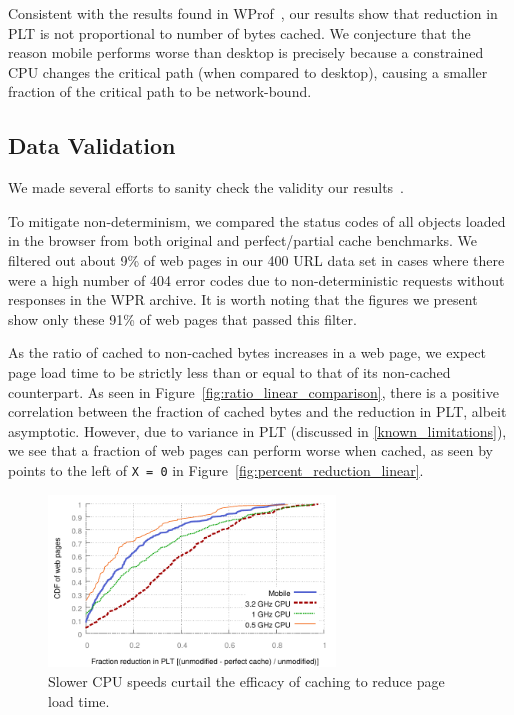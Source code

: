 Consistent with the results found in WProf~\cite{wang2013demystifying}, our results show that reduction in PLT is not proportional to number of bytes cached. We conjecture that the reason mobile performs worse than desktop is precisely because a constrained CPU changes the critical path (when compared to desktop), causing a smaller fraction of the critical path to be network-bound. 


\subsection{Data Validation}
\label{subsec:validation}
We made several efforts to sanity check the validity our results~\cite{sanity-checks}. 

To mitigate non-determinism, we compared the status codes of all objects loaded in the browser from both original and perfect/partial cache benchmarks. We filtered out about 9\% of web pages in our 400 URL data set in cases where there were a high number of 404 error codes due to non-deterministic requests without responses in the WPR archive. It is worth noting that the figures we present show only these 91\% of web pages that passed this filter.

As the ratio of cached to non-cached bytes increases in a web page, we expect page load time to be strictly less than or equal to that of its non-cached counterpart. As seen in Figure~\ref{fig:ratio_linear_comparison}, there is a positive correlation between the fraction of cached bytes and the reduction in PLT, albeit asymptotic.
However, due to variance in PLT (discussed in \ref{known_limitations}), we see that a fraction of web pages can perform worse when cached, as seen by points to the left of \texttt{X = 0} in Figure~\ref{fig:percent_reduction_linear}.



\begin{figure}[t]
    \includegraphics[width=3in]{../graphs/percent_plt_reduction/percent_reduction_linear_CPU_comparison.pdf}
    \caption[]{\label{fig:plt_cpu_comparison}Slower CPU speeds curtail the efficacy of caching to reduce page load time.}
\end{figure}
